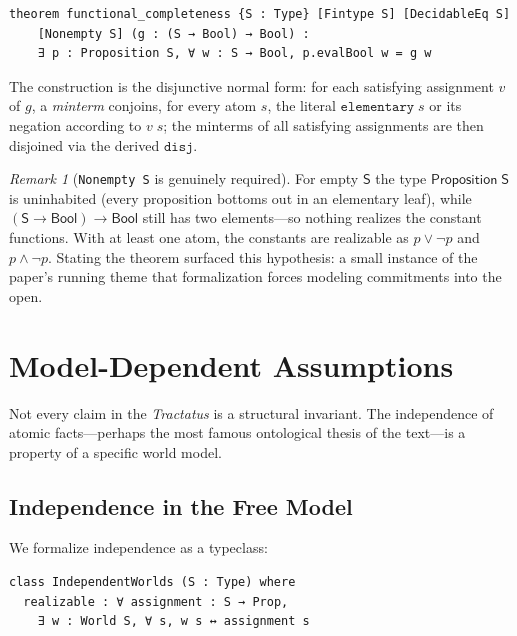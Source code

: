 \documentclass[10pt, letterpaper]{article}
\theoremstyle{definition}
\theoremstyle{remark}
\newtheorem{remark}[theorem]{Remark}
\newcommand{\Sach}{\mathsf{S}}
\begin{document}
\begin{lstlisting}
theorem functional_completeness {S : Type} [Fintype S] [DecidableEq S]
    [Nonempty S] (g : (S → Bool) → Bool) :
    ∃ p : Proposition S, ∀ w : S → Bool, p.evalBool w = g w
\end{lstlisting}

\noindent
The construction is the disjunctive normal form: for each
satisfying assignment $v$ of $g$, a \emph{minterm} conjoins, for
every atom $s$, the literal $\mathtt{elementary}\;s$ or its
negation according to $v\;s$; the minterms of all satisfying
assignments are then disjoined via the derived $\mathtt{disj}$.

\begin{remark}[\texttt{Nonempty S} is genuinely required]
\label{rem:fc-nonempty}
For empty $\Sach$ the type $\mathsf{Proposition}\;\Sach$ is
uninhabited (every proposition bottoms out in an elementary
leaf), while $(\Sach \to \mathsf{Bool}) \to \mathsf{Bool}$ still
has two elements---so nothing realizes the constant functions.
With at least one atom, the constants are realizable as
$p \lor \lnot p$ and $p \land \lnot p$.  Stating the theorem
surfaced this hypothesis: a small instance of the paper's
running theme that formalization forces modeling commitments
into the open.
\end{remark}

\section{Model-Dependent Assumptions}
\label{sec:assumptions}

Not every claim in the \emph{Tractatus} is a structural
invariant.  The independence of atomic facts---perhaps the most
famous ontological thesis of the text---is a property of a
specific world model.

\subsection{Independence in the Free Model}
\label{sec:independence}

We formalize independence as a typeclass:

\begin{lstlisting}
class IndependentWorlds (S : Type) where
  realizable : ∀ assignment : S → Prop,
    ∃ w : World S, ∀ s, w s ↔ assignment s
\end{lstlisting}
\end{document}
